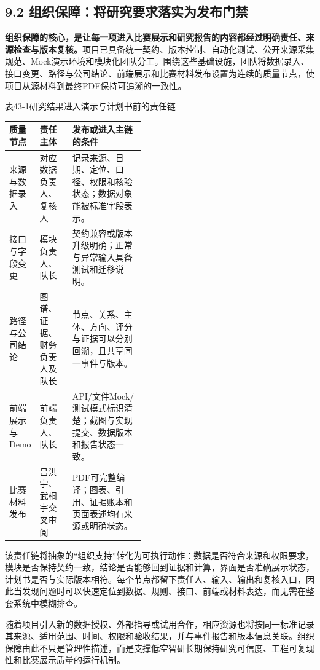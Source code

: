 \subsection*{9.2 组织保障：将研究要求落实为发布门禁}\label{page:43}
\noindent\textbf{组织保障的核心，是让每一项进入比赛展示和研究报告的内容都经过明确责任、来源检查与版本复核。}项目已具备统一契约、版本控制、自动化测试、公开来源采集规范、Mock演示环境和模块化团队分工。围绕这些基础设施，团队将数据录入、接口变更、路径与公司结论、前端展示和比赛材料发布设置为连续的质量节点，使项目从源材料到最终PDF保持可追溯的一致性\cite{lhy-data-standard,lhy-team}。

\begin{center}\small 表43-1\quad 研究结果进入演示与计划书前的责任链\par\vspace{1mm}
\begin{tabularx}{\linewidth}{p{0.20\linewidth}p{0.24\linewidth}X}
\toprule
质量节点 & 责任主体 & 发布或进入主链的条件\\
\midrule
来源与数据录入 & 对应数据负责人、复核人 & 记录来源、日期、定位、口径、权限和核验状态；数据对象能被标准字段表示。\\
接口与字段变更 & 模块负责人、队长 & 契约兼容或版本升级明确；正常与异常输入具备测试和迁移说明。\\
路径与公司结论 & 图谱、证据、财务负责人及队长 & 节点、关系、主体、方向、评分与证据可以分别回溯，且共享同一事件与版本。\\
前端展示与Demo & 前端负责人、队长 & API/文件Mock/测试模式标识清楚；截图与实现提交、数据版本和报告状态一致。\\
比赛材料发布 & 吕洪宇、武桐宇交叉审阅 & PDF可完整编译；图表、引用、证据账本和页面表述均有来源或明确状态。\\
\bottomrule
\end{tabularx}\end{center}

该责任链将抽象的“组织支持”转化为可执行动作：数据是否符合来源和权限要求，模块是否保持契约一致，结论是否能够回到证据和计算，界面是否准确展示状态，计划书是否与实际版本相符。每个节点都留下责任人、输入、输出和复核入口，因此当发现问题时可以快速定位到数据、规则、接口、前端或材料表达，而无需在整套系统中模糊排查。

随着项目引入新的数据授权、外部指导或试用合作，相应资源也将按同一标准记录其来源、适用范围、时间、权限和验收结果，并与事件报告和版本信息关联。组织保障由此不只是管理性描述，而是支撑低空智研长期保持研究可信度、工程可复现性和比赛展示质量的运行机制。
